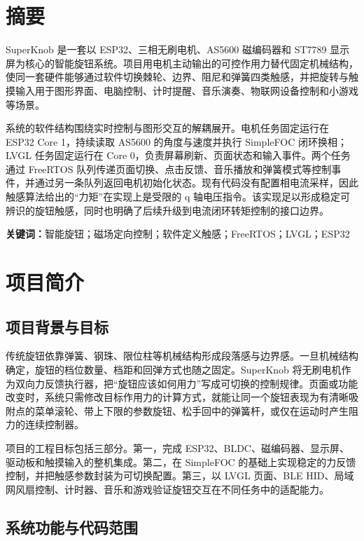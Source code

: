 \documentclass[12pt,a4paper,UTF8]{ctexart}
\begin{document}
\makeprojectcover
\setcounter{tocdepth}{2}
\tableofcontents
\newpage

\section*{摘要}

SuperKnob 是一套以 ESP32、三相无刷电机、AS5600 磁编码器和 ST7789 显示屏为核心的智能旋钮系统。项目用电机主动输出的可控作用力替代固定机械结构，使同一套硬件能够通过软件切换棘轮、边界、阻尼和弹簧四类触感，并把旋转与触摸输入用于图形界面、电脑控制、计时提醒、音乐演奏、物联网设备控制和小游戏等场景。

系统的软件结构围绕实时控制与图形交互的解耦展开。电机任务固定运行在 ESP32 Core 1，持续读取 AS5600 的角度与速度并执行 SimpleFOC 闭环换相；LVGL 任务固定运行在 Core 0，负责屏幕刷新、页面状态和输入事件。两个任务通过 FreeRTOS 队列传递页面切换、点击反馈、音乐播放和弹簧模式等控制事件，并通过另一条队列返回电机初始化状态。现有代码没有配置相电流采样，因此触感算法给出的“力矩”在实现上是受限的 q 轴电压指令。该实现足以形成稳定可辨识的旋钮触感，同时也明确了后续升级到电流闭环转矩控制的接口边界。

\textbf{关键词：}智能旋钮；磁场定向控制；软件定义触感；FreeRTOS；LVGL；ESP32

\section{项目简介}

\subsection{项目背景与目标}

传统旋钮依靠弹簧、钢珠、限位柱等机械结构形成段落感与边界感。一旦机械结构确定，旋钮的档位数量、档距和回弹方式也随之固定。SuperKnob 将无刷电机作为双向力反馈执行器，把“旋钮应该如何用力”写成可切换的控制规律。页面或功能改变时，系统只需修改目标作用力的计算方式，就能让同一个旋钮表现为有清晰吸附点的菜单滚轮、带上下限的参数旋钮、松手回中的弹簧杆，或仅在运动时产生阻力的连续控制器。

项目的工程目标包括三部分。第一，完成 ESP32、BLDC、磁编码器、显示屏、驱动板和触摸输入的整机集成。第二，在 SimpleFOC 的基础上实现稳定的力反馈控制，并把触感参数封装为可切换配置。第三，以 LVGL 页面、BLE HID、局域网风扇控制、计时器、音乐和游戏验证旋钮交互在不同任务中的适配能力。

\subsection{系统功能与代码范围}
\end{document}
